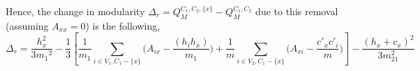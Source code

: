 Hence, the change in modularity $\Delta_r=Q_M^{C_1,C_2,\{x\}}-Q_M^{C_1,C_2}$ due to this removal (assuming $A_{xx} = 0$) is the following,
\vspace{-0.05in}
\begin{dmath*}\label{final4}
\Delta_r = \frac{h_x^2}{3{m_1}^2} -
  \frac{1}{3}\left[
    \frac{1}{m_1} \sum_{i \in V_1, C_1 - \{x\}} \big(A_{ix} - \frac{(h_i h_x)}{m_1}\big) +
    \frac{1}{m} \sum_{i \in V_2, C_1 - \{x\}} \big(A_{xi} - \frac{ {c'}_x  {c'}_i}{m}\big)
    \right] - \frac{ (h_x+c_x)^2}{3m_{21}^2}
\end{dmath*}
\vspace{-0.05in}


